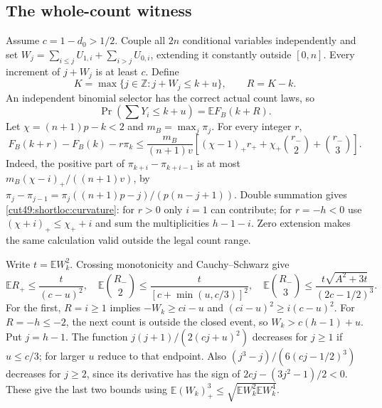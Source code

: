 \documentclass[11pt,a4paper]{article}
\numberwithin{equation}{section}
\theoremstyle{definition}
\theoremstyle{remark}
\begin{document}
\subsection{The whole-count witness}

Assume $c=1-d_0>1/2$. Couple all $2n$ conditional variables independently and
set $W_j=\sum_{i\le j}U_{1,i}+\sum_{i>j}U_{0,i}$, extending it constantly
outside $[0,n]$. Every increment of $j+W_j$ is at least $c$. Define
\[
 K=\max\{j\in\mathbb Z:j+W_j\le k+u\},\qquad R=K-k.
\]
An independent binomial selector has the correct actual count laws, so
\begin{equation}\label{cut49:shortloc:cutoff}
                  \Pr(\textstyle\sum Y_i\le k+u)=\mathbb EF_B(k+R).
\end{equation}
Let $\chi=(n+1)p-k<2$ and $m_B=\max_j\pi_j$. For every integer $r$,
\begin{equation}\label{cut49:shortloc:curvature}
 F_B(k+r)-F_B(k)-r\pi_k\le\frac{m_B}{(n+1)v}
 \left[(\chi-1)_+r_++\chi_+\binom{r_-}{2}+\binom{r_-}{3}\right].
\end{equation}
Indeed, the positive part of $\pi_{k+i}-\pi_{k+i-1}$ is at most
$m_B(\chi-i)_+/((n+1)v)$, by
$\pi_j-\pi_{j-1}=\pi_j((n+1)p-j)/(p(n-j+1))$.
Double summation gives \eqref{cut49:shortloc:curvature}: for $r>0$ only $i=1$
can contribute; for $r=-h<0$ use $(\chi+i)_+\le\chi_++i$ and sum the
multiplicities $h-1-i$. Zero extension makes the same calculation valid
outside the legal count range.

Write $t=\mathbb EW_k^2$. Crossing monotonicity and Cauchy--Schwarz give
\begin{equation}\label{cut49:shortloc:crossingmoments}
 \mathbb ER_+\le\frac{t}{(c-u)^2},\quad
 \mathbb E\binom{R_-}{2}\le\frac{t}{[c+\min(u,c/3)]^2},\quad
 \mathbb E\binom{R_-}{3}\le\frac{t\sqrt{A^2+3t}}{(2c-1/2)^3}.
\end{equation}
For the first, $R=i\ge1$ implies $-W_k\ge ci-u$ and
$(ci-u)^2\ge i(c-u)^2$. For $R=-h\le-2$, the next count is outside the
closed event, so $W_k>c(h-1)+u$. Put $j=h-1$.
The function $j(j+1)/(2(cj+u)^2)$ decreases for $j\ge1$ if $u\le c/3$;
for larger $u$ reduce to that endpoint. Also
$(j^3-j)/(6(cj-1/2)^3)$ decreases for $j\ge2$, since its derivative has
the sign of $2cj-(3j^2-1)/2<0$. These give the last two bounds using
$\mathbb E(W_k)_+^3\le\sqrt{\mathbb EW_k^2\mathbb EW_k^4}$.
\end{document}
